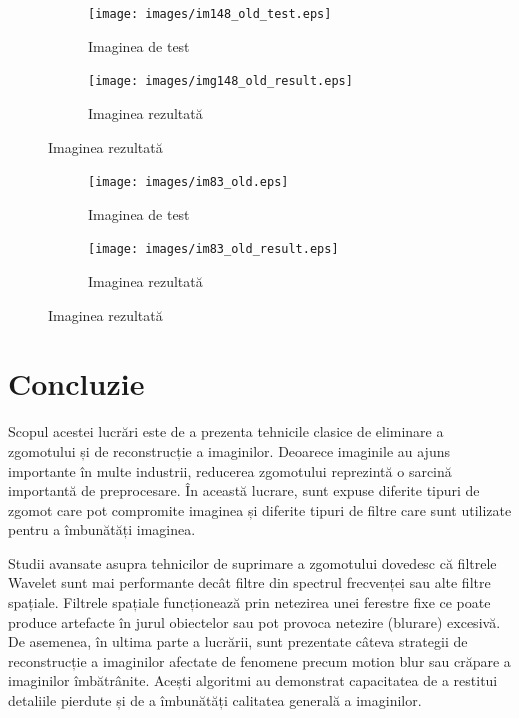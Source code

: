 \documentclass[12pt]{article}
\begin{document}
\begin{figure}[h!]
    \begin{subfigure}{0.49\textwidth}
        \centering
        \texttt{[image: images/im148\_old\_test.eps]}
        \caption{Imaginea de test}
        \label{fig:im148_old_test}
    \end{subfigure}
    \hspace{10pt}
    \begin{subfigure}{0.49\textwidth}
        \centering
        \texttt{[image: images/img148\_old\_result.eps]}
        \caption{Imaginea rezultată}
        \label{fig:img148_old_result}
    \end{subfigure}
\end{figure}
\newpage

\begin{figure}[h!]
    \begin{subfigure}{0.49\textwidth}
        \centering
        \texttt{[image: images/im83\_old.eps]}
        \caption{Imaginea de test}
        \label{fig:im83_old}
    \end{subfigure}
    \hspace{10pt}
    \begin{subfigure}{0.49\textwidth}
        \centering
        \texttt{[image: images/im83\_old\_result.eps]}
        \caption{Imaginea rezultată}
        \label{fig:im83_old_result}
    \end{subfigure}
\end{figure}

\newpage


\section{Concluzie}
\label{sec:Concluzie}
Scopul acestei lucrări este de a prezenta tehnicile clasice de eliminare a zgomotului și de reconstrucție a imaginilor. Deoarece imaginile au ajuns importante în multe industrii, reducerea zgomotului reprezintă o sarcină importantă de preprocesare. În această lucrare, sunt expuse diferite tipuri de zgomot care pot compromite imaginea și diferite tipuri de filtre care sunt utilizate pentru a îmbunătăți imaginea. 

Studii avansate asupra tehnicilor de suprimare a zgomotului dovedesc că filtrele Wavelet sunt mai performante decât filtre din spectrul frecvenței sau alte filtre spațiale. Filtrele spațiale funcționează prin netezirea unei ferestre fixe ce poate produce artefacte în jurul obiectelor sau pot provoca netezire (blurare) excesivă. De asemenea, în ultima parte a lucrării, sunt prezentate câteva strategii de reconstrucție a imaginilor afectate de fenomene precum motion blur sau crăpare a imaginilor îmbătrânite. Acești algoritmi au demonstrat capacitatea de a restitui detaliile pierdute și de a îmbunătăți calitatea generală a imaginilor.
\newpage
\end{document}
